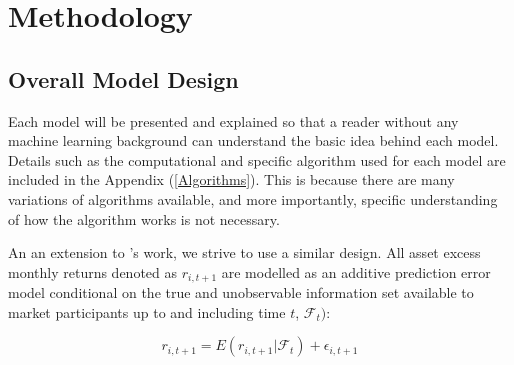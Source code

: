 \documentclass[a4paper, table]{article}
\newcommand{\smalltodo}[2][] {\todo[caption={#2}, size=\scriptsize,%
	fancyline,#1]{\begin{spacing}{.5}#2\end{spacing}}}
\newcommand{\rhs}[2][]{\smalltodo[color=green!30,#1]{{\bf RS:} #2}}
\begin{document}





\section{Methodology}

\subsection{Overall Model Design}

Each model will be presented and explained so that a reader without any machine learning background can understand the basic idea behind each model. Details such as the computational and specific algorithm used for each model are included in the Appendix (\ref{Algorithms}). This is because there are many variations of algorithms available, and more importantly, specific understanding of how the algorithm works is not necessary. 

An an extension to \cite{gu_empirical_2018}'s work, we strive to use a similar design. All asset excess monthly returns denoted as $r_{i, t+1}$ are modelled as an additive prediction error model conditional on the true and unobservable information set available to market participants up to and including time $t$, $\mathcal{F}_t)$:

\begin{equation}
	r_{i, t+1} = E(r_{i, t+1} | \mathcal{F}_t) + \epsilon_{i, t+1}
\end{equation}
\end{document}
